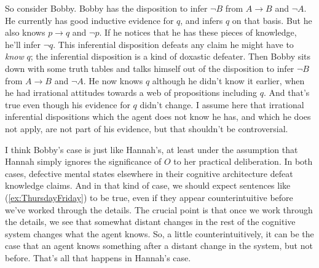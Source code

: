 So consider Bobby. Bobby has the disposition to infer \(\neg B\) from \(A \rightarrow B\) and \(\neg A\). He currently has good inductive evidence for \(q\), and infers \(q\) on that basis. But he also knows \(p \rightarrow q\) and \(\neg p\). If he notices that he has these pieces of knowledge, he'll infer \(\neg q\). This inferential disposition defeats any claim he might have to \textit{know} \(q\); the inferential disposition is a kind of doxastic defeater. Then Bobby sits down with some truth tables and talks himself out of the disposition to infer \(\neg B\) from \(A \rightarrow B\) and \(\neg A\). He now knows \(q\) although he didn't know it earlier, when he had irrational attitudes towards a web of propositions including \(q\). And that's true even though his evidence for \(q\) didn't change. I assume here that irrational inferential dispositions which the agent does not know he has, and which he does not apply, are not part of his evidence, but that shouldn't be controversial.

I think Bobby's case is just like Hannah's, at least under the assumption that Hannah simply ignores the significance of \(O\) to her practical deliberation. In both cases, defective mental states elsewhere in their cognitive architecture defeat knowledge claims. And in that kind of case, we should expect sentences like (\ref{ex:ThursdayFriday}) to be true, even if they appear counterintuitive before we've worked through the details. The crucial point is that once we work through the details, we see that somewhat distant changes in the rest of the cognitive system changes what the agent knows. So, a little counterintuitively, it can be the case that an agent knows something after a distant change in the system, but not before. That's all that happens in Hannah's case.